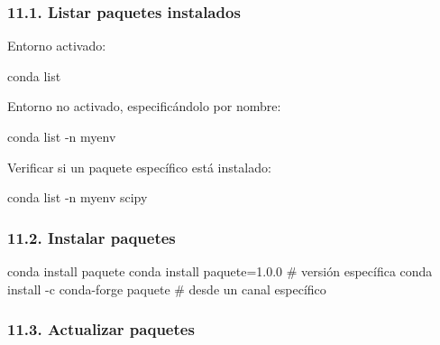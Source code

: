\documentclass[
  doc,
  floatsintext,
  longtable,
  a4paper,
  nolmodern,
  notxfonts,
  notimes,
  12pt,
  colorlinks=true,linkcolor=blue,citecolor=blue,urlcolor=blue]{apa7}
\newenvironment{Shaded}{\begin{snugshade}}{\end{snugshade}}
\newcommand{\AttributeTok}[1]{\textcolor[rgb]{0.40,0.45,0.13}{#1}}
\newcommand{\CommentTok}[1]{\textcolor[rgb]{0.37,0.37,0.37}{#1}}
\newcommand{\ExtensionTok}[1]{\textcolor[rgb]{0.00,0.23,0.31}{#1}}
\newcommand{\NormalTok}[1]{\textcolor[rgb]{0.00,0.23,0.31}{#1}}
\begin{document}
\subsubsection{11.1. Listar paquetes
instalados}\label{listar-paquetes-instalados}

Entorno activado:

\begin{Shaded}
\begin{Highlighting}[]
\ExtensionTok{conda}\NormalTok{ list}
\end{Highlighting}
\end{Shaded}

Entorno no activado, especificándolo por nombre:

\begin{Shaded}
\begin{Highlighting}[]
\ExtensionTok{conda}\NormalTok{ list }\AttributeTok{{-}n}\NormalTok{ myenv}
\end{Highlighting}
\end{Shaded}

Verificar si un paquete específico está instalado:

\begin{Shaded}
\begin{Highlighting}[]
\ExtensionTok{conda}\NormalTok{ list }\AttributeTok{{-}n}\NormalTok{ myenv scipy}
\end{Highlighting}
\end{Shaded}

\subsubsection{11.2. Instalar paquetes}\label{instalar-paquetes}

\begin{Shaded}
\begin{Highlighting}[]
\ExtensionTok{conda}\NormalTok{ install paquete}
\ExtensionTok{conda}\NormalTok{ install paquete=1.0.0          }\CommentTok{\# versión específica}
\ExtensionTok{conda}\NormalTok{ install }\AttributeTok{{-}c}\NormalTok{ conda{-}forge paquete  }\CommentTok{\# desde un canal específico}
\end{Highlighting}
\end{Shaded}

\subsubsection{11.3. Actualizar paquetes}\label{actualizar-paquetes}
\end{document}
